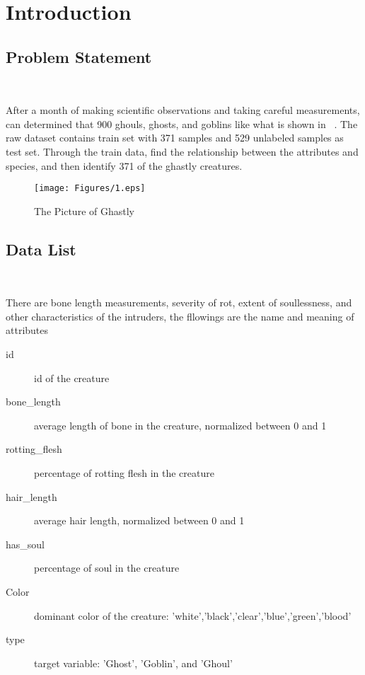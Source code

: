
\section{Introduction}\label{sec-intro}

\subsection{Problem Statement}
\

After a month of making scientific observations 
and taking careful measurements, 
can determined that 900 ghouls, ghosts, and goblins
like what is shown in~  .
The raw dataset contains train set with 371 
samples and 529 unlabeled samples as test set.
Through the train data, find the relationship
between the attributes and species, 
and then identify 371 of the ghastly creatures.


\begin{figure}[htbp]
	\centering
	\texttt{[image: Figures/1.eps]}
	\caption{The Picture of Ghastly}\label{fig:animal}
\end{figure}


\subsection{Data List}
\

There are bone length measurements, 
severity of rot, extent of soullessness, 
and other characteristics of the intruders,
the fllowings are the  
name and meaning of attributes


\begin{description}
	\item[id] id of the creature
	\item[bone\_length] average length of bone in the creature, normalized between 0 and 1
	\item[rotting\_flesh] percentage of rotting flesh in the creature
	\item[hair\_length] average hair length, normalized between 0 and 1
	\item[has\_soul] percentage of soul in the creature
	\item[Color] dominant color of the creature: 'white','black','clear','blue','green','blood'
	\item[type] target variable: 'Ghost', 'Goblin', and 'Ghoul'
\end{description}


